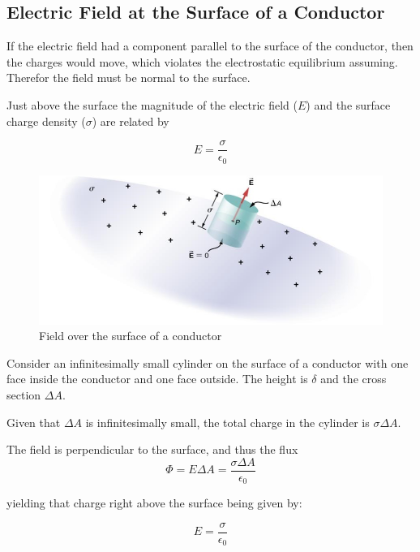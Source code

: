 \documentclass[14pt]{memoir}
\begin{document}
\subsection{Electric Field at the Surface of a Conductor}

If the electric field had a component parallel to the surface of the conductor, then the charges would move, which violates the electrostatic equilibrium assuming. Therefor the field must be normal to the surface. 

Just above the surface the magnitude of the electric field ($E$) and the surface charge density ($\sigma$) are related by

\begin{equation}
E = \frac{\sigma}{\epsilon_0}
\end{equation}

\begin{figure}[H]
\begin{center}
\includegraphics[scale=0.40]{fig/fig_06_39.jpg}
\caption{Field over the surface of a conductor}
\label{fig:06_39}
\end{center}
\end{figure}

Consider an infinitesimally small cylinder on the surface of a conductor with one face inside the conductor and one face outside. The height is $\delta$ and the cross section $\Delta A$. 

Given that $\Delta A$ is infinitesimally small, the total charge in the cylinder is $\sigma \Delta A$. 

The field is perpendicular to the surface, and thus the flux 
\begin{equation}
\Phi = E \Delta A = \frac{\sigma \Delta A}{\epsilon_0}
\end{equation}

yielding that charge right above the surface being given by:

\begin{equation}
E = \frac{\sigma}{\epsilon_0}
\end{equation}
\end{document}
